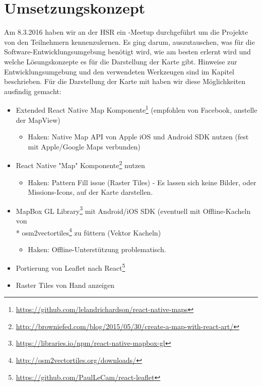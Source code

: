 \chapter{Umsetzungskonzept}
\label{tb-umsetzungskonzept}
Am 8.3.2016 haben wir an der HSR ein -Meetup durchgeführt um die Projekte von den Teilnehmern kennenzulernen. 
Es ging darum, auszutauschen, was für die Software-Entwicklungsumgebung benötigt wird, wie  am besten erlernt wird und welche Lösungskonzepte es für die Darstellung der Karte gibt.
Hinweise zur Entwicklungsumgebung und den verwendeten Werkzeugen sind im Kapitel  beschrieben.
Für die Darstellung der Karte mit  haben wir diese Möglichkeiten ausfindig gemacht:

\begin{itemize}
    \item Extended React Native Map Komponente\footnote{\url{https://github.com/lelandrichardson/react-native-maps}} (empfohlen von Facebook, anstelle der MapView)
    \begin{itemize}
    	\item Haken: Native Map API von Apple iOS und Android SDK nutzen (fest mit Apple/Google Maps verbunden)
	\end{itemize}
	
    \item React Native "Map" Komponente\footnote{\url{http://browniefed.com/blog/2015/05/30/create-a-map-with-react-art/}} nutzen
    \begin{itemize}
    	\item Haken: Pattern Fill issue (Raster Tiles) - Es lassen sich keine Bilder, oder Missions-Icons, auf der Karte darstellen.
	\end{itemize}     

    \item MapBox GL Library\footnote{\url{https://libraries.io/npm/react-native-mapbox-gl}} mit Android/iOS SDK  (eventuell mit Offline-Kacheln von\\* osm2vectortiles\footnote{\url{http://osm2vectortiles.org/downloads/}} zu füttern (Vektor Kacheln)
    \begin{itemize}
    	\item Haken: Offline-Unterstützung problematisch.
	\end{itemize}   
	
    \item Portierung von Leaflet nach React\footnote{\url{https://github.com/PaulLeCam/react-leaflet}}
    \item Raster Tiles von Hand anzeigen
\end{itemize}

